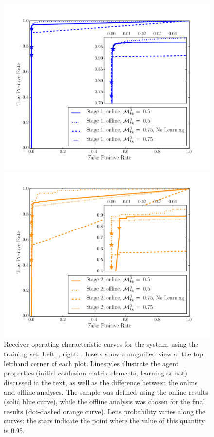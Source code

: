 \documentclass[useAMS,usenatbib,a4paper]{mn2e}
\begin{document}
\begin{figure}
\begin{minipage}{0.48\linewidth}
  \centering\includegraphics[width=\linewidth]{stage1_ROC.pdf}
\end{minipage}\hfill
\begin{minipage}{0.48\linewidth}
  \centering\includegraphics[width=\linewidth]{stage2_ROC.pdf}
\end{minipage}
\caption{Receiver operating characteristic curves for the \SW system, using
the \cfhtls training set. Left: \StageOne, right: \StageTwo. Insets show a
magnified view of the top lefthand corner of each plot. Linestyles illustrate
the agent properties (initial confusion matrix elements, learning or not)
discussed in the text, as well as the difference between the online and offline
analyses. The \StageTwo sample was defined using the online \StageOne results
(solid blue curve), while the offline analysis was chosen for the final
\StageTwo results (dot-dashed orange curve).
Lens probability varies along the curves: the stars indicate the point where
the value of this quantity is 0.95.}
\label{fig:results:sample:roc}
\end{figure}
\end{document}
